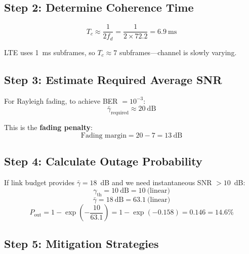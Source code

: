 \subsection*{Step 2: Determine Coherence Time}

\begin{equation}
T_c \approx \frac{1}{2f_d} = \frac{1}{2 \times 72.2} = 6.9~\text{ms}
\end{equation}

LTE uses 1~ms subframes, so $T_c \approx 7$ subframes---channel is slowly varying.

\subsection*{Step 3: Estimate Required Average SNR}

For Rayleigh fading, to achieve BER $= 10^{-3}$:
\begin{equation}
\bar{\gamma}_{\text{required}} \approx 20~\text{dB}
\end{equation}

This is the \textbf{fading penalty}:
\begin{equation}
\text{Fading margin} = 20 - 7 = 13~\text{dB}
\end{equation}

\subsection*{Step 4: Calculate Outage Probability}

If link budget provides $\bar{\gamma} = 18$~dB and we need instantaneous SNR $> 10$~dB:
\begin{equation}
\gamma_{\text{th}} = 10~\text{dB} = 10~\text{(linear)}
\end{equation}
\begin{equation}
\bar{\gamma} = 18~\text{dB} = 63.1~\text{(linear)}
\end{equation}
\begin{equation}
P_{\text{out}} = 1 - \exp\left(-\frac{10}{63.1}\right) = 1 - \exp(-0.158) = 0.146 = 14.6\%
\end{equation}

\subsection*{Step 5: Mitigation Strategies}

